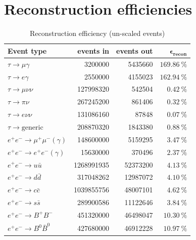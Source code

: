 \documentclass[12pt]{thesis}  %
\begin{document}
\section{Reconstruction efficiencies}

\begin{table}[h]
\centering
\begin{tabular}{lrrr}
\textbf{Event type}         & \textbf{events in} & \textbf{events out} & $\mathbf{\epsilon_{\text{recon}}}$ \\ \hline 
\rowcolor[HTML]{EFEFEF} 
$\tau\to\mu\gamma$       & \num{3200000}        & \num{5435660}      & $\SI{169.86}{\percent}$                   \\
\rowcolor[HTML]{EFEFEF} 
$\tau\to e \gamma$      & \num{2550000}       & \num{4155023}       & $\SI{162.94}{\percent}$                            \\
$\tau\to\mu\nu\nu$      & \num{127998320}         & \num{542504}          & $\SI{0.42}{\percent}$           \\
$\tau\to\pi\nu$         & \num{267245200}       & \num{861406}          & $\SI{0.32}{\percent}$            \\
$\tau\to e\nu\nu$       & \num{131086160}        & \num{87848}         & $\SI{0.07}{\percent}$      \\
$\tau\to\text{generic}$  & \num{208870320}       & \num{1843380}          & $\SI{0.88}{\percent}$         \\
$e^+ e^- \to \mu^+ \mu^- (\gamma)$   & \num{148600000}    & \num{5159295}     & $\SI{3.47}{\percent}$   \\
$e^+ e^- \to e^+ e^- (\gamma)$      & \num{15630000}      & \num{370496}       & $\SI{2.37}{\percent}$     \\
$e^+ e^- \to u \bar{u}$       & \num{1268991935}           & \num{52373200}  & $\SI{4.13}{\percent}$ \\
$e^+ e^- \to d \bar{d}$        & \num{317048262}       & \num{12987072}      & $\SI{4.10}{\percent}$       \\
$e^+ e^- \to c \bar{c}$        & \num{1039855756}       & \num{48007101}           & $\SI{4.62}{\percent}$          \\
$e^+ e^- \to s \bar{s}$       & \num{289900586}     & \num{11122646}            & $\SI{3.84}{\percent}$         \\
$e^+ e^- \to B^+ B^-$     & \num{451320000}       & \num{46498047}           & $\SI{10.30}{\percent}$          \\
$e^+ e^- \to B^0 \bar{B}^0$       & \num{427680000}           & \num{46912228}        & $\SI{10.97}{\percent}$              
\end{tabular}
\caption{Reconstruction efficiency (un-scaled events)}
\label{my-label}
\end{table}
\end{document}
